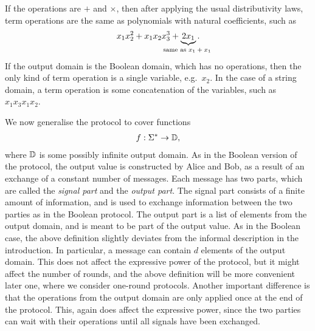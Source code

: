 \begin{myexample}
    If the operations are $+$ and $\times$, then after applying the usual distributivity laws,   term operations are the same as polynomials with natural coefficients, such as 
\begin{align*}
x_1x_2^2 + x_1x_2x_3^3  + \myunderbrace{2x_1}{same as $x_1 + x_1$}.
\end{align*}
If the output domain is the Boolean domain, which has no operations, then the only kind of term operation is a single variable, e.g.~$x_2$.  In the case of a string domain, a term operation is some concatenation of the variables, such as $x_1 x_3 x_1 x_2$.
\end{myexample}



We now generalise the protocol to cover functions 
\begin{align*}
f : \Sigma^* \to \mathbb D,
\end{align*}
where $\mathbb D$ is some possibly infinite output domain. As in the Boolean
version of the protocol, the output value is constructed by Alice and Bob, as a
result of an exchange of a constant number of messages. Each message has two
parts, which are called the \emph{signal part} and the \emph{output part}. The
signal part consists of a finite amount of information, and is used to exchange
information between the two parties as in the Boolean protocol. The output part
is a list of elements from the  output domain, and  is meant to be part of the
output value. As in the Boolean case, the above definition slightly deviates
from the informal description in the introduction. In particular, a message can
contain $d$ elements of the output domain. This does not affect the expressive
power of the protocol, but it might affect the number of rounds, and the above
definition will be more convenient later one, where we consider one-round
protocols. Another important difference is that the operations from the output
domain are only applied once at the end of the protocol. This, again does
affect the expressive power, since the two parties can wait with their
operations until all signals have been exchanged.  

